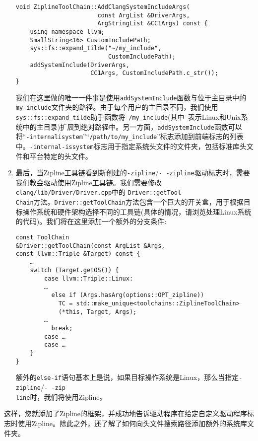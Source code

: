 \begin{enumerate}
\begin{lstlisting}[style=styleCXX]
void ZiplineToolChain::AddClangSystemIncludeArgs(
                       const ArgList &DriverArgs,
                       ArgStringList &CC1Args) const {
	using namespace llvm;
	SmallString<16> CustomIncludePath;
	sys::fs::expand_tilde("~/my_include",
	                      CustomIncludePath);
	addSystemInclude(DriverArgs,
	                 CC1Args, CustomIncludePath.c_str());
}
\end{lstlisting}

我们在这里做的唯一一件事是使用\texttt{addSystemInclude}函数与位于主目录中的\texttt{my\_include}文件夹的路径。由于每个用户的主目录不同，我们使用\texttt{sys::fs::expand\_tilde}助手函数将\texttt{~/my\_include}(其中\texttt{~}表示Linux和Unix系统中的主目录)扩展到绝对路径中。另一方面，\texttt{addSystemInclude}函数可以将“\texttt{-internalisystem}”“\texttt{/path/to/my\_include}”标志添加到前端标志的列表中。\texttt{-internal-issystem}标志用于指定系统头文件的文件夹，包括标准库头文件和平台特定的头文件。

\item 最后，当Zipline工具链看到新创建的\texttt{-zipline}/\texttt{-\,-zipline}驱动标志时，需要我们教会驱动使用Zipline工具链。我们需要修改\texttt{clang/lib/Driver/Driver.cpp}中的 \texttt{Driver::getTool\\Chain}方法。\texttt{Driver::getToolChain}方法包含一个巨大的开关盒，用于根据目标操作系统和硬件架构选择不同的工具链(具体的情况，请浏览处理Linux系统的代码)。我们将在这里添加一个额外的分支条件:

\begin{lstlisting}[style=styleCXX]
const ToolChain
&Driver::getToolChain(const ArgList &Args,
const llvm::Triple &Target) const {
	…
	switch (Target.getOS()) {
		case llvm::Triple::Linux:
		…
		  else if (Args.hasArg(options::OPT_zipline))
		    TC = std::make_unique<toolchains::ZiplineToolChain>
		    (*this, Target, Args);
		…
		  break;
		case …
		case …
	}
}
\end{lstlisting}

额外的\texttt{else-if}语句基本上是说，如果目标操作系统是Linux，那么当指定\texttt{-zipline}/\texttt{-\,-zip\\line}时，我们将使用Zipline。

\end{enumerate}

这样，您就添加了Zipline的框架，并成功地告诉驱动程序在给定自定义驱动程序标志时使用Zipline。除此之外，还了解了如何向头文件搜索路径添加额外的系统库文件夹。

